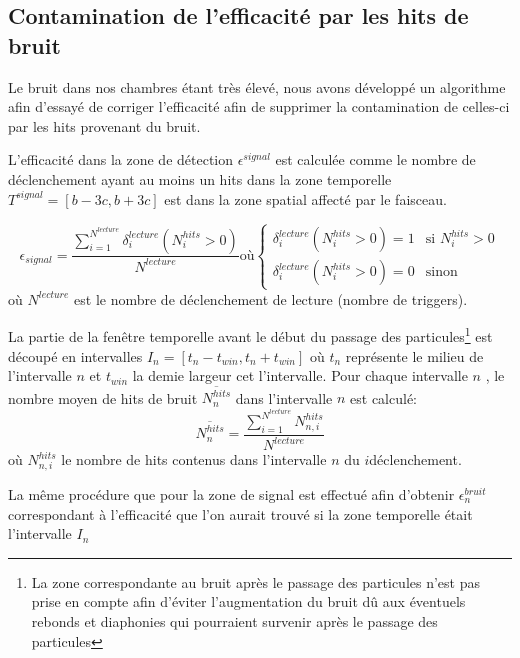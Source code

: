 \subsection{Contamination de l'efficacité par les hits de bruit}

Le bruit dans nos chambres étant très élevé, nous avons développé un algorithme afin d'essayé de corriger l'efficacité afin de supprimer la contamination de celles-ci par les hits provenant du bruit.

L'efficacité dans la zone de détection $\epsilon^{signal}$ est calculée comme le nombre de déclenchement ayant au moins un hits dans la zone temporelle $T^{signal}=\left[b-3c,b+3c\right]$ est dans la zone spatial affecté par le faisceau.

\begin{equation}
\epsilon_{signal}=\frac{\sum\limits_{i=1}^{N^{lecture}} \delta^{lecture}_i(N^{hits}_{i}>0)}{N^{lecture}} \mbox{où}
\left\{
\begin{array}{ll}
\delta^{lecture}_i(N^{hits}_{i}>0)=1 & \mbox{si } N^{hits}_{i}>0 \\
\delta^{lecture}_i(N^{hits}_{i}>0)=0 & \mbox{sinon}
\end{array}
\right.
\end{equation}
où $N^{lecture}$ est le nombre de déclenchement de lecture (nombre de triggers).

La partie de la fenêtre temporelle avant le début du passage des particules\footnote{La zone correspondante au bruit après le passage des particules n'est pas prise en compte afin d'éviter l'augmentation du bruit dû aux éventuels rebonds et diaphonies qui pourraient survenir après le passage des particules} est découpé en intervalles $I_{n}=\left[t_{n}-t_{win},t_{n}+t_{win}\right]$ où $t_{n}$ représente le milieu de l'intervalle $n$ et $t_{win}$ la demie largeur cet l'intervalle. Pour chaque intervalle $n$ , le nombre moyen de hits de bruit $\overline{N^{hits}_n}$ dans l'intervalle $n$ est calculé:
\begin{equation}
\overline{N^{hits}_n}=\frac{\sum\limits_{i=1}^{N^{lecture}} N^{hits}_{n,i}}{N^{lecture}}
\end{equation}
où $N^{hits}_{n,i}$ le nombre de hits contenus dans l'intervalle $n$ du $i$\ieme déclenchement.

La même procédure que pour la zone de signal est effectué afin d'obtenir $\epsilon^{bruit}_n$ correspondant à l'efficacité que l'on aurait trouvé si la zone temporelle était l'intervalle $I_{n}$

